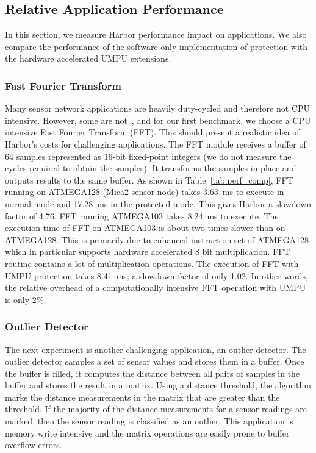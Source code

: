\subsection{Relative Application Performance}
%
In this section, we measure Harbor performance impact on
applications.
%
We also compare the performance of the software only implementation of
protection with the hardware accelerated UMPU extensions.
%
\subsubsection{Fast Fourier Transform}
%
Many sensor network applications are heavily duty-cycled and therefore
not CPU intensive.
%
However, some are not~\cite{ben06vango}, and for our first benchmark,
we choose a CPU intensive Fast Fourier Transform (FFT).  
%
This should present a realistic idea of Harbor's
costs for challenging applications.
%
The FFT module receives a buffer of 64 samples represented as 16-bit
fixed-point integers (we do not measure the cycles required to obtain the
samples).
%
It transforms the samples in place and outputs results to the same buffer.
%
As shown in Table~\ref{tab:perf_comp}, FFT running on ATMEGA128 (Mica2
sensor node) takes 3.63~ms to execute in normal mode and 17.28~ms in the
protected mode.
%
This gives Harbor a slowdown factor of 4.76.
%
FFT running ATMEGA103 takes 8.24~ms to execute.
%
The execution time of FFT on ATMEGA103 is about two times slower than
on ATMEGA128.
%
This is primarily due to enhanced instruction set of ATMEGA128 which
in particular supports hardware accelerated 8 bit multiplication.
%
FFT routine contains a lot of multiplication operations.
%
The execution of FFT with UMPU protection takes 8.41~ms; a slowdown
factor of only 1.02.
%
In other words, the relative overhead of a computationally intensive
FFT operation with UMPU is only 2\%.
%
\subsubsection{Outlier Detector}
The next experiment is another challenging application, an outlier detector.
%
The outlier detector samples a set of sensor values and stores them in a buffer.
%
Once the buffer is filled, it computes the distance between all pairs of samples in the buffer and stores the result in a matrix.
%
Using a distance threshold, the algorithm marks the distance measurements in the matrix that are greater than the threshold.
%
If the majority of the distance measurements for a sensor readings are marked, then the sensor reading is classified as an outlier.
%
This application is memory write intensive and the matrix operations are easily prone to buffer overflow errors.
%

